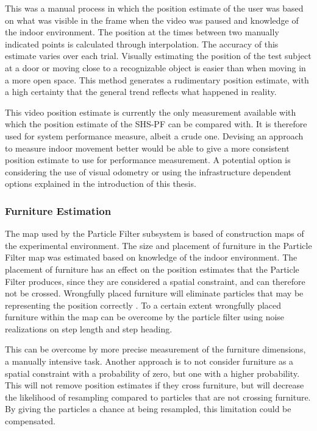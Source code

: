 This was a manual process in which the position estimate of the user was based on what was visible in the frame when the video was paused and knowledge of the indoor environment. The position at the times between two manually indicated points is calculated through interpolation. The accuracy of this estimate varies over each trial. Visually estimating the position of the test subject at a door or moving close to a recognizable object is easier than when moving in a more open space. This method generates a rudimentary position estimate, with a high certainty that the general trend reflects what happened in reality.  \par 

This video position estimate is currently the only measurement available with which the position estimate of the SHS-PF can be compared with. It is therefore used for system performance measure, albeit a crude one. Devising an approach to measure indoor movement better would be able to give a more consistent position estimate to use for performance measurement. A potential option is considering the use of visual odometry or using the infrastructure dependent options explained in the introduction of this thesis. \par 



\subsubsection{Furniture Estimation}
The map used by the Particle Filter subsystem is based of construction maps of the experimental environment. The size and placement of furniture in the Particle Filter map was estimated based on knowledge of the indoor environment. The placement of furniture has an effect on the position estimates that the Particle Filter produces, since they are considered a spatial constraint, and can therefore not be crossed. Wrongfully placed furniture will eliminate particles that may be representing the position correctly . To a certain extent wrongfully placed furniture within the map can be overcome by the particle filter using noise realizations on step length and step heading. \par 

This can be overcome by more precise measurement of the furniture dimensions, a manually intensive task. Another approach is to not consider furniture as a spatial constraint with a probability of zero, but one with a higher probability. This will not remove position estimates if they cross furniture, but will decrease the likelihood of resampling compared to particles that are not crossing furniture. By giving the particles a chance at being resampled, this limitation could be compensated.

